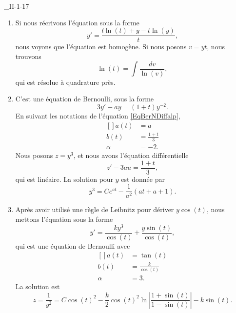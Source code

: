 

\begin{corrige}{_II-1-17}

\begin{enumerate}

\item
Si nous récrivons l'équation sous la forme
\begin{equation}
	y'=\frac{ l\ln(t)+y-t\ln(y) }{ t },
\end{equation}
nous voyons que l'équation est homogène. Si nous posons $v=yt$, nous trouvons
\begin{equation}
	\ln(t)=\int\frac{ dv }{ \ln(v) },
\end{equation}
qui est résolue à quadrature près.

\item
C'est une équation de Bernoulli, sous la forme
\begin{equation}
	3y'-ay=(1+t)y^{-2}.
\end{equation}
En suivant les notations de l'équation \eqref{EqBerNDiffalp}, 
\begin{equation}
	\begin{aligned}[]
		a(t)&=a\\
		b(t)&=\frac{ 1+t }{ 3 }\\
		\alpha&=-2.
	\end{aligned}
\end{equation}
Nous posons $z=y^3$, et nous avons l'équation différentielle
\begin{equation}
	z'-3au=\frac{ 1+t }{ 3 },
\end{equation}
qui est linéaire. La solution pour $y$ est donnée par
\begin{equation}
	y^3=C e^{at}-\frac{1}{ a^2 }(at+a+1).
\end{equation}

\item
Après avoir utilisé une règle de Leibnitz pour dériver $y\cos(t)$, nous mettons l'équation sous la forme
\begin{equation}
	y'=\frac{ ky^3 }{ \cos(t) }+\frac{ y\sin(t) }{ \cos(t) },
\end{equation}
qui est une équation de Bernoulli avec
\begin{equation}
	\begin{aligned}[]
		a(t)&=\tan(t)\\
		b(t)&=\frac{ k }{ \cos(t) }\\	
		\alpha&=3.
	\end{aligned}
\end{equation}
La solution est
\begin{equation}
	z=\frac{1}{ y^2 }=C\cos(t)^2-\frac{ k }{2}\cos(t)^2\ln\left| \frac{ 1+\sin(t) }{ 1-\sin(t) } \right| -k\sin(t).
\end{equation}


\end{enumerate}
\end{corrige}
